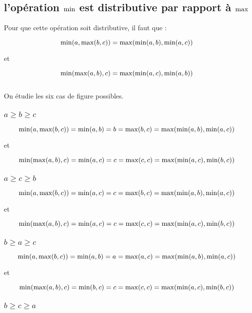 \documentclass{article}
\begin{document}
\subsection{l'opération $\mmin$ est distributive par rapport à $\mmax$}

Pour que cette opération soit distributive, il faut que :

$$\mmin(a, \mmax(b,c)) = \mmax(\mmin(a,b),\mmin(a,c))$$
\begin{center}et\end{center}
$$\mmin(\mmax(a,b),c) = \mmax(\mmin(a,c),\mmin(a,b))$$\\

On étudie les six cas de figure possibles.

\subsubsection{$a \geq b \geq c$}

$$\mmin(a, \mmax(b, c)) = \mmin(a, b) = b = \mmax(b,c) = \mmax(\mmin(a, b),\mmin(a,c))$$
\begin{center}et\end{center}
$$\mmin(\mmax(a,b),c) = \mmin(a,c) = c = \mmax(c,c) = \mmax(\mmin(a,c),\mmin(b,c))$$

\subsubsection{$a \geq c \geq b$}

$$\mmin(a, \mmax(b, c)) = \mmin(a, c) = c = \mmax(b,c) = \mmax(\mmin(a, b),\mmin(a,c))$$
\begin{center}et\end{center}
$$\mmin(\mmax(a,b),c) = \mmin(a,c) = c = \mmax(c,c) = \mmax(\mmin(a,c),\mmin(b,c))$$

\subsubsection{$b \geq a \geq c$}

$$\mmin(a, \mmax(b, c)) = \mmin(a, b) = a = \mmax(a,c) = \mmax(\mmin(a, b),\mmin(a,c))$$
\begin{center}et\end{center}
$$\mmin(\mmax(a,b),c) = \mmin(b,c) = c = \mmax(c,c) = \mmax(\mmin(a,c),\mmin(b,c))$$

\subsubsection{$b \geq c \geq a$}
\end{document}
